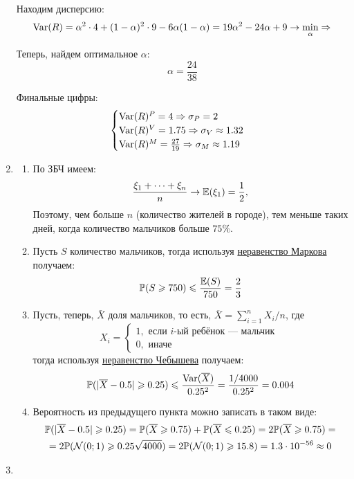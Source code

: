 \begin{enumerate}
Находим дисперсию:
\[
\operatorname{Var}(R) = \alpha^2 \cdot 4 + (1-\alpha)^2 \cdot 9 - 6\alpha (1-\alpha) = 19\alpha^2 -24\alpha + 9 \to \min_{\alpha} \Rightarrow
\]

Теперь, найдем оптимальное $\alpha$:
\[
\alpha = \frac{24}{38}
\]

Финальные цифры:
\[
\begin{cases}
\operatorname{Var}(R)^{P} = 4 \Rightarrow \sigma_{P} = 2 \\
\operatorname{Var}(R)^{V} = 1.75 \Rightarrow \sigma_{V} \approx 1.32 \\
\operatorname{Var}(R)^{M} = \frac{27}{19} \Rightarrow \sigma_{M} \approx 1.19 \\
\end{cases}
\]

\item
\begin{enumerate}
\item По ЗБЧ имеем:
\[
\frac{\xi_1 + \dots + \xi_n}{n} \to \mathbb{E}(\xi_1) = \frac{1}{2},
\]
Поэтому, чем больше $n$ (количество жителей в городе), тем меньше таких дней, когда количество мальчиков больше $75\%.$ \\
\item Пусть $S$ количество мальчиков, тогда используя \href{https://en.wikipedia.org/wiki/Markov%27s_inequality}{неравенство Маркова} получаем:
\[
\mathbb{P}(S \geqslant 750) \leqslant \frac{\mathbb{E}(S)}{750} = \frac{2}{3}
\]
\item Пусть, теперь, $\bar X$ доля мальчиков, то есть, $\overline{X} = \sum_{i=1}^n X_i /n$, где
\[
X_i =
\begin{cases}
1, \text{ если }i\text{-ый ребёнок — мальчик }\\
0, \text{ иначе }
\end{cases}
\]
тогда используя \href{https://en.wikipedia.org/wiki/Markov%27s_inequality}{неравенство Чебышева} получаем:
\[
\mathbb{P}(|\overline{X} - 0.5| \geqslant 0.25) \leqslant \frac{\operatorname{Var}(\overline{X})}{0.25^2} = \frac{1/4000}{0.25^2} = 0.004
\]
\item Вероятность из предыдущего пункта можно записать в таком виде:
\begin{multline*}
\mathbb{P}(|\overline{X} - 0.5| \geqslant 0.25) = \mathbb{P}(\overline{X} \geqslant 0.75) + \mathbb{P}(\overline{X} \leqslant 0.25) = 2\mathbb{P}(\overline{X} \geqslant 0.75)=\\
= 2\mathbb{P}(\mathcal{N}(0;1)\geqslant 0.25\sqrt{4000})=2\mathbb{P}(\mathcal{N}(0;1)\geqslant 15.8) = 1.3 \cdot 10^{-56} \approx 0
\end{multline*}
\end{enumerate}

\item


\end{enumerate}
